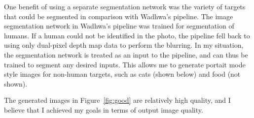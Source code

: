 \documentclass{article}
\begin{document}
One benefit of using a separate segmentation network was the variety of targets that could be segmented in comparison with Wadhwa's
pipeline.
%
The image segmentation network in Wadhwa's pipeline was trained for segmentation of humans.
%
If a human could not be identified in the photo, the pipeline fell back to using only dual-pixel depth map data to perform the
blurring.
%
In my situation, the segmentation network is treated as an input to the pipeline, and can thus be trained to segment any desired
inputs.
%
This allows me to generate portait mode style images for non-human targets, such as cats (shown below) and food (not shown).

The generated images in Figure~\ref{fig:good} are relatively high quality, and I believe that I achieved my goals in terms of output image quality.
\end{document}
